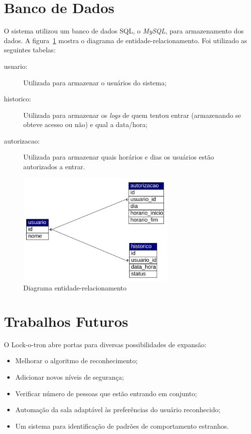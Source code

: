 \documentclass[12pt]{article}
\begin{document}
\section{Banco de Dados}
	O sistema utilizou um banco de dados SQL, o \textit{MySQL}, para armazenamento dos dados. A figura~\ref{fig:ent-rel} mostra o diagrama de entidade-relacionamento. Foi utilizado as seguintes tabelas:

		\begin{description}
			\item [usuario:] Utilizada para armazenar o usuários do sistema;
			\item [historico:] Utilizada para armazenar os \textit{logs} de quem tentou entrar (armazenando se obteve acesso ou não) e qual a data/hora;
			\item [autorizacao:] Utilizada para armazenar quais horários e dias os usuários estão autorizados a entrar.
		\end{description}
		
		\begin{figure}[ht]
		\centering
		\includegraphics[width=0.7\textwidth]{bd-der}
		\caption{Diagrama entidade-relacionamento}
		\label{fig:ent-rel}
	\end{figure}

\section{Trabalhos Futuros}
    O Lock-o-tron abre portas para diversas possibilidades de expansão:
    \begin{itemize}
        \item Melhorar o algoritmo de reconhecimento;
        \item Adicionar novos níveis de segurança;
        \item Verificar número de pessoas que estão entrando em conjunto;
        \item Automação da sala adaptável às preferências do usuário reconhecido;
        \item Um sistema para identificação de padrões de comportamento estranhos.
    \end{itemize}
\end{document}
